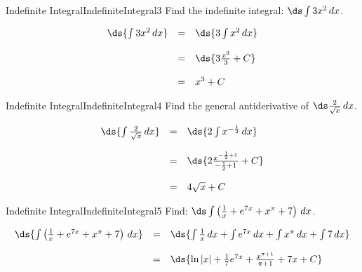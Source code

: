 \begin{example}{Indefinite Integral}{IndefiniteIntegral3}
Find the indefinite integral: $\ds\int 3x^2\,dx$.
\end{example}
\begin{solution}
	$$\begin{array}{rcl}
	\ds{\int 3x^2\,dx} & = & \ds{3\int x^2\,dx}\\
	\\
	&=&\ds{3\frac{x^3}{3}+C}\\
	\\
	&=&x^3+C\\
	\end{array} $$
\end{solution}

\begin{example}{Indefinite Integral}{IndefiniteIntegral4}
Find the general antiderivative of $\ds \frac{2}{\sqrt x}\,dx$.
\end{example}
\begin{solution}
	$$\begin{array}{rcl}
	\ds{\int \frac{2}{\sqrt x}\,dx} & = & \ds{2\int x^{-\frac{1}{2}}\,dx}\\
	\\
	&=&\ds{2\frac{x^{-\frac{1}{2}+1}}{-\frac{1}{2}+1}+C}\\
	\\
	&=&4\sqrt x+C\\
	\end{array}$$
\end{solution}

\begin{example}{Indefinite Integral}{IndefiniteIntegral5}
Find:  $\ds\int \left(\frac{1}{x}+e^{7x}+x^\pi+7\right)\,dx$.
\end{example}
\begin{solution}
	$$\begin{array}{rcl}
	\ds{\int \left(\frac{1}{x}+e^{7x}+x^\pi+7\right)\,dx} & = & \ds{\int \frac{1}{x}\,dx+\int e^{7x}\,dx+\int x^\pi\,dx+\int 7\,dx}\\
	\\
	&=& \ds{\ln|x|+\frac{1}{7}e^{7x}+\frac{x^{\pi+1}}{\pi+1}+7x+C}\\
	\end{array}$$
\end{solution}

